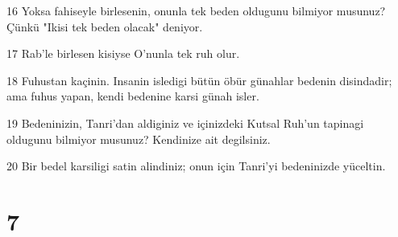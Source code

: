 \par 16 Yoksa fahiseyle birlesenin, onunla tek beden oldugunu bilmiyor musunuz? Çünkü "Ikisi tek beden olacak" deniyor.
\par 17 Rab'le birlesen kisiyse O'nunla tek ruh olur.
\par 18 Fuhustan kaçinin. Insanin isledigi bütün öbür günahlar bedenin disindadir; ama fuhus yapan, kendi bedenine karsi günah isler.
\par 19 Bedeninizin, Tanri'dan aldiginiz ve içinizdeki Kutsal Ruh'un tapinagi oldugunu bilmiyor musunuz? Kendinize ait degilsiniz.
\par 20 Bir bedel karsiligi satin alindiniz; onun için Tanri'yi bedeninizde yüceltin.

\chapter{7}

